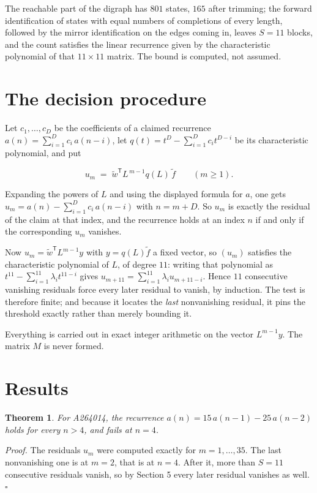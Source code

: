 \documentclass[11pt]{article}
\newtheorem{theorem}{Theorem}
\theoremstyle{definition}
\begin{document}
The reachable part of the digraph has $801$ states, $165$ after trimming; the forward identification of states with equal numbers of completions of every length, followed by the mirror identification on the edges coming in, leaves $S = 11$ blocks, and the count satisfies the linear recurrence given by the characteristic polynomial of that $11\times11$ matrix. The bound is computed, not assumed.

\section{The decision procedure}

Let $c_1,\dots,c_D$ be the coefficients of a claimed recurrence $a(n) = \sum_{i=1}^{D} c_i\,a(n-i)$, let $q(t) = t^{D} - \sum_{i=1}^{D} c_i t^{D-i}$ be its characteristic polynomial, and put

\[u_m \;=\; \tilde w^{\mathsf T} L^{\,m-1} q(L)\,\tilde f \qquad (m \ge 1).\]

Expanding the powers of $L$ and using the displayed formula for $a$, one gets $u_m = a(n) - \sum_{i=1}^{D} c_i\,a(n-i)$ with $n = m + D$. So $u_m$ is exactly the residual of the claim at that index, and the recurrence holds at an index $n$ if and only if the corresponding $u_m$ vanishes.

Now $u_m = \tilde w^{\mathsf T} L^{m-1} y$ with $y = q(L)\tilde f$ a fixed vector, so $(u_m)$ satisfies the characteristic polynomial of $L$, of degree $11$: writing that polynomial as $t^{11} - \sum_{i=1}^{11} \lambda_i t^{11-i}$ gives $u_{m+11} = \sum_{i=1}^{11} \lambda_i u_{m+11-i}$. Hence $11$ consecutive vanishing residuals force every later residual to vanish, by induction. The test is therefore finite; and because it locates the {\itshape last} nonvanishing residual, it pins the threshold exactly rather than merely bounding it.

Everything is carried out in exact integer arithmetic on the vector $L^{m-1}y$. The matrix $M$ is never formed.

\section{Results}

\begin{theorem} For A264014, the recurrence $a(n) = 15\,a(n-1) - 25\,a(n-2)$ holds for every $n > 4$, and fails at $n = 4$.\end{theorem}

{\itshape Proof.} The residuals $u_m$ were computed exactly for $m = 1,\dots,35$. The last nonvanishing one is at $m = 2$, that is at $n = 4$. After it, more than $S = 11$ consecutive residuals vanish, so by Section 5 every later residual vanishes as well. $\square$
\end{document}

